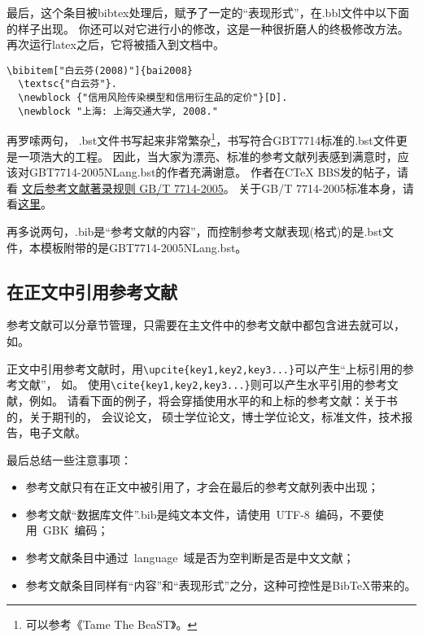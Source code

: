 最后，这个条目被bibtex处理后，赋予了一定的``表现形式''，在.bbl文件中以下面的样子出现。
你还可以对它进行小的修改，这是一种很折磨人的终极修改方法。
再次运行latex之后，它将被插入到文档中。

\begin{lstlisting}[caption={.bbl中被格式化之后的条目}, escapeinside="", numbers=none]
\bibitem["白云芬(2008)"]{bai2008}
  \textsc{"白云芬"}.
  \newblock {"信用风险传染模型和信用衍生品的定价"}[D].
  \newblock "上海: 上海交通大学, 2008."
\end{lstlisting}

再罗嗦两句，
.bst文件书写起来非常繁杂\footnote{可以参考《Tame The BeaST》。}，书写符合GBT7714标准的.bst文件更是一项浩大的工程。
因此，当大家为漂亮、标准的参考文献列表感到满意时，应该对GBT7714-2005NLang.bst的作者充满谢意。
作者在CTeX BBS发的帖子，请看
\href{http://bbs.ctex.org/viewthread.php?tid=33571&highlight=\%B2\%CE\%BF\%BC\%CE\%C4\%CF\%D7\%2BGB}{文后参考文献著录规则 GB/T 7714-2005}。
关于GB/T 7714-2005标准本身，请看\href{http://bbs.ctex.org/viewthread.php?tid=33571&highlight=GB\%2B\%B2\%CE\%BF\%BC\%CE\%C4\%CF\%D7}{这里}。

再多说两句，.bib是“参考文献的内容”，而控制参考文献表现(格式)的是.bst文件，本模板附带的是GBT7714-2005NLang.bst。

\subsection{在正文中引用参考文献}

参考文献可以分章节管理，只需要在主文件中的参考文献中都包含进去就可以，如\verb++。

正文中引用参考文献时，用\verb+\upcite{key1,key2,key3...}+可以产生“上标引用的参考文献”，
如。
使用\verb+\cite{key1,key2,key3...}+则可以产生水平引用的参考文献，例如\cite{JohnD,zhubajie,IEEE-1363}。
请看下面的例子，将会穿插使用水平的和上标的参考文献：关于书的\cite{Meta_CN,JohnD,IEEE-1363}，关于期刊的，
会议论文\cite{DPMG,kocher99,cnproceed}，
硕士学位论文\cite{zhubajie,metamori2004}，博士学位论文，标准文件\cite{IEEE-1363}，技术报告，电子文献\cite{xiaoyu2001, CHRISTINE1998}。

最后总结一些注意事项：
\begin{itemize}
\item 参考文献只有在正文中被引用了，才会在最后的参考文献列表中出现；
\item 参考文献``数据库文件''.bib是纯文本文件，请使用~UTF-8~编码，不要使用~GBK~编码；
\item 参考文献条目中通过~language~域是否为空判断是否是中文文献；
\item 参考文献条目同样有“内容”和“表现形式”之分，这种可控性是BibTeX带来的。
\end{itemize}


